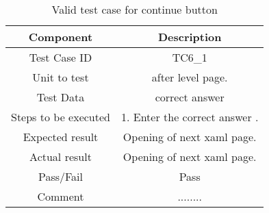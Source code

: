 \begin{table}[htb!]
\label{table : tc11}
\centering %
\begin{tabular}{c c} %
\hline\hline %
 Component & Description \\ [0.5ex] %
\hline %
Test Case ID & TC6\_1   \\
Unit to test &after level page. \\ 
Test Data &correct answer\\
Steps to be executed &1. Enter the correct answer .\\
Expected result  &Opening of next xaml page.\\ 
Actual result &Opening of next xaml page.\\
Pass/Fail &Pass\\
Comment &........\\

\hline %
\end{tabular}
\caption{Valid test case for continue button} \label{table:tc11} %
\end{table}




